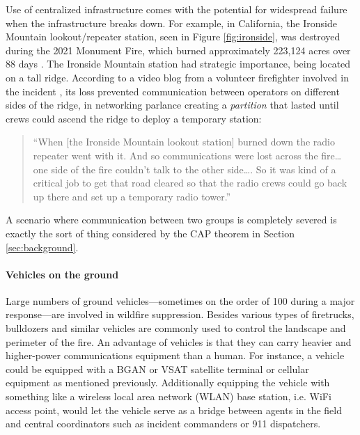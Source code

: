 \documentclass[]             %
{NASA}                       %
\theoremstyle{definition}
\begin{document}
Use of centralized infrastructure comes with the potential for
widespread failure when the infrastructure breaks down. For example,
in California, the Ironside Mountain lookout/repeater station, seen in
Figure \ref{fig:ironside}, was destroyed during the 2021 Monument
Fire, which burned approximately 223,124 acres over 88 days
\cite{2021:monumentfire}. The Ironside Mountain station had strategic
importance, being located on a tall ridge. According to a video blog
from a volunteer firefighter involved in the incident \cite{2022:mechfire},
its loss prevented communication between operators on different sides
of the ridge, in networking parlance creating a \emph{partition} that
lasted until crews could ascend the ridge to deploy a temporary
station:
\begin{quote}
  ``When {[}the Ironside Mountain lookout station{]} burned down the
  radio repeater went with it. And so communications were lost across
  the fire\ldots{} one side of the fire couldn't talk to the other
  side\ldots.  So it was kind of a critical job to get that road
  cleared so that the radio crews could go back up there and set up a
  temporary radio tower.''
\end{quote}
A scenario where communication between two groups is completely
severed is exactly the sort of thing considered by the CAP theorem in
Section \ref{sec:background}.

\paragraph{Vehicles on the ground}
Large numbers of ground vehicles---sometimes on the order of 100 during a major response---are involved in wildfire suppression. Besides various types of firetrucks, bulldozers and similar vehicles are commonly used to control the landscape and perimeter of the fire. An advantage of vehicles is that they can carry
heavier and higher-power communications equipment than a human. For instance, a vehicle could be equipped with a BGAN or VSAT satellite terminal or cellular equipment as mentioned previously. Additionally equipping the vehicle with something like a wireless local area network (WLAN) base station, i.e. WiFi access point, would let the vehicle serve as a bridge between agents in the field and central coordinators such as incident commanders or 911 dispatchers.
\end{document}
